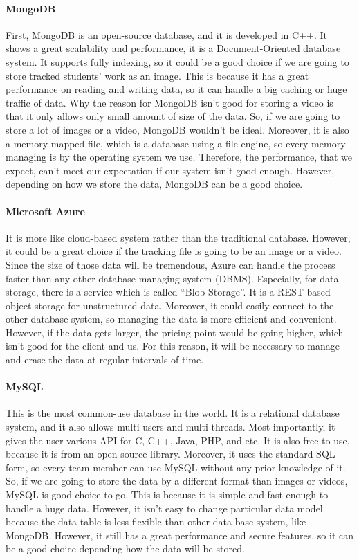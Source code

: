 \documentclass[10pt]{article}
\begin{document}
            \paragraph{MongoDB}
                First, MongoDB is an open-source database, and it is developed in C++. It shows a great scalability and performance, it is a Document-Oriented database system. It supports fully indexing, so it could be a good choice if we are going to store tracked students’ work as an image. This is because it has a great performance on reading and writing data, so it can handle a big caching or huge traffic of data. Why the reason for MongoDB isn’t good for storing a video is that it only allows only small amount of size of the data. So, if we are going to store a lot of images or a video, MongoDB wouldn’t be ideal. Moreover, it is also a memory mapped file, which is a database using a file engine, so every memory managing is by the operating system we use. Therefore, the performance, that we expect, can’t meet our expectation if our system isn’t good enough. However, depending on how we store the data, MongoDB can be a good choice. \cite{mongo}

            \paragraph{Microsoft Azure}
                It is more like cloud-based system rather than the traditional database. However, it could be a great choice if the tracking file is going to be an image or a video. Since the size of those data will be tremendous, Azure can handle the process faster than any other database managing system (DBMS). Especially, for data storage, there is a service which is called “Blob Storage”. It is a REST-based object storage for unstructured data. Moreover, it could easily connect to the other database system, so managing the data is more efficient and convenient. However, if the data gets larger, the pricing point would be going higher, which isn’t good for the client and us. For this reason, it will be necessary to manage and erase the data at regular intervals of time. \cite{azure}

            \paragraph{MySQL}
                This is the most common-use database in the world. It is a relational database system, and it also allows multi-users and multi-threads. Most importantly, it gives the user various API for C, C++, Java, PHP, and etc. It is also free to use, because it is from an open-source library. Moreover, it uses the standard SQL form, so every team member can use MySQL without any prior knowledge of it. So, if we are going to store the data by a different format than images or videos, MySQL is good choice to go. This is because it is simple and fast enough to handle a huge data. However, it isn’t easy to change particular data model because the data table is less flexible than other data base system, like MongoDB. However, it still has a great performance and secure features, so it can be a good choice depending how the data will be stored. \cite{mysql}
\end{document}
